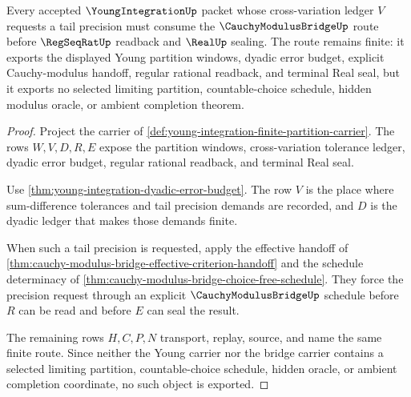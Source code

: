 \begin{theorem}
\label{thm:young-integration-cauchy-modulus-consumer}
Every accepted $\YoungIntegrationUp$ packet whose cross-variation ledger $V$ requests a tail precision must consume the $\CauchyModulusBridgeUp$ route before $\RegSeqRatUp$ readback and $\RealUp$ sealing. The route remains finite: it exports the displayed Young partition windows, dyadic error budget, explicit Cauchy-modulus handoff, regular rational readback, and terminal Real seal, but it exports no selected limiting partition, countable-choice schedule, hidden modulus oracle, or ambient completion theorem.
\end{theorem}
\begin{proof}
Project the carrier of \autoref{def:young-integration-finite-partition-carrier}. The rows $W,V,D,R,E$ expose the partition windows, cross-variation tolerance ledger, dyadic error budget, regular rational readback, and terminal Real seal.

Use \autoref{thm:young-integration-dyadic-error-budget}. The row $V$ is the place where sum-difference tolerances and tail precision demands are recorded, and $D$ is the dyadic ledger that makes those demands finite.

When such a tail precision is requested, apply the effective handoff of \autoref{thm:cauchy-modulus-bridge-effective-criterion-handoff} and the schedule determinacy of \autoref{thm:cauchy-modulus-bridge-choice-free-schedule}. They force the precision request through an explicit $\CauchyModulusBridgeUp$ schedule before $R$ can be read and before $E$ can seal the result.

The remaining rows $H,C,P,N$ transport, replay, source, and name the same finite route. Since neither the Young carrier nor the bridge carrier contains a selected limiting partition, countable-choice schedule, hidden oracle, or ambient completion coordinate, no such object is exported.
\end{proof}



